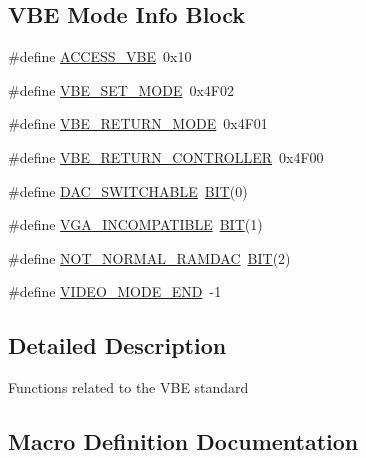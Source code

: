 \subsection*{V\+BE Mode Info Block}
\begin{DoxyCompactItemize}
\item 
\#define \hyperlink{group__vbe_ga2d1a8b0e816e406118cd71de77b25980}{A\+C\+C\+E\+S\+S\+\_\+\+V\+BE}~0x10
\item 
\#define \hyperlink{group__vbe_ga02477c4996ff058aee590b54f2146eb5}{V\+B\+E\+\_\+\+S\+E\+T\+\_\+\+M\+O\+DE}~0x4\+F02
\item 
\#define \hyperlink{group__vbe_gab9d80b9e6d7846ea3fa090c817771866}{V\+B\+E\+\_\+\+R\+E\+T\+U\+R\+N\+\_\+\+M\+O\+DE}~0x4\+F01
\item 
\#define \hyperlink{group__vbe_ga7850c02defc99773b2704700c6cab3fd}{V\+B\+E\+\_\+\+R\+E\+T\+U\+R\+N\+\_\+\+C\+O\+N\+T\+R\+O\+L\+L\+ER}~0x4\+F00
\item 
\#define \hyperlink{group__vbe_ga3ad7c0b541b23959da95fb0963ae87ff}{D\+A\+C\+\_\+\+S\+W\+I\+T\+C\+H\+A\+B\+LE}~\hyperlink{timer_8h_a3a8ea58898cb58fc96013383d39f482c}{B\+IT}(0)
\item 
\#define \hyperlink{group__vbe_gafbbec0fabb4cff4fcb019abaf5009b15}{V\+G\+A\+\_\+\+I\+N\+C\+O\+M\+P\+A\+T\+I\+B\+LE}~\hyperlink{timer_8h_a3a8ea58898cb58fc96013383d39f482c}{B\+IT}(1)
\item 
\#define \hyperlink{group__vbe_gaf0836b8b975bc8425e8ae42c7a36097e}{N\+O\+T\+\_\+\+N\+O\+R\+M\+A\+L\+\_\+\+R\+A\+M\+D\+AC}~\hyperlink{timer_8h_a3a8ea58898cb58fc96013383d39f482c}{B\+IT}(2)
\item 
\#define \hyperlink{group__vbe_ga31c4f01ef75778f174c6d73864661fe4}{V\+I\+D\+E\+O\+\_\+\+M\+O\+D\+E\+\_\+\+E\+ND}~-\/1
\end{DoxyCompactItemize}


\subsection{Detailed Description}
Functions related to the V\+BE standard 

\subsection{Macro Definition Documentation}
\mbox{\label{group__vbe_ga2d1a8b0e816e406118cd71de77b25980}} 
